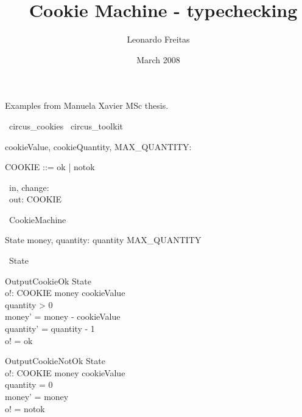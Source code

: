 \documentclass{article}
\begin{document}
\title{\Circus\ Cookie Machine - typechecking}
\author{Leonardo Freitas}
\date{March 2008}

\maketitle

Examples from Manuela Xavier MSc thesis.
%
\begin{zsection}
  \SECTION\ circus\_cookies \parents\ circus\_toolkit
\end{zsection}

\begin{axdef}
   cookieValue, cookieQuantity, MAX\_QUANTITY: \nat
\end{axdef}

\begin{zed}
   COOKIE ::= ok | notok
\end{zed}

\begin{circus}
   \circchannel\ in, change: \nat \\
   \circchannel\ out: COOKIE
\end{circus}

\begin{circus}
   \circprocess\ CookieMachine \circdef \circbegin
\end{circus}

\begin{schema}{State}
   money, quantity: \nat
\where
   quantity \leq MAX\_QUANTITY
\end{schema}

\begin{circusaction}
   \circstate\ State
\end{circusaction}

\begin{schema}{OutputCookieOk}
   \Delta State \\
   o!: COOKIE
\where
   money \geq cookieValue \\
   quantity > 0 \\
   money' = money - cookieValue \\
   quantity' = quantity - 1 \\
   o! = ok
\end{schema}

\begin{schema}{OutputCookieNotOk}
   \Delta State \\
   o!: COOKIE
\where
   money \geq cookieValue \\
   quantity = 0 \\
   money' = money \\
   o! = notok
\end{schema}
\end{document}
